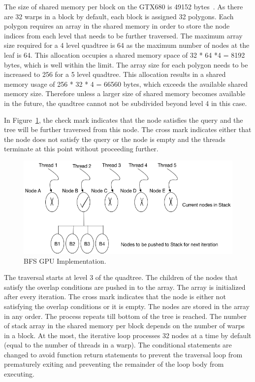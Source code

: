 The size of shared memory per block on the GTX680 is 49152 bytes~\cite{nvidia:12:gtx680tech}. As there are 32 warps in a block by default, each block is assigned  32 polygons. Each polygon requires an array in the shared memory in order to store the node indices from each level that needs to be further traversed. The maximum array size required for a 4 level quadtree is 64 as the maximum number of nodes at the leaf is 64. This allocation occupies a shared memory space of 32 * 64 *4 = 8192 bytes, which is well within the limit. The array size for each polygon needs to be increased to 256 for a 5 level quadtree. This allocation results in a shared memory usage of 256 * 32 * 4  = 66560 bytes, which exceeds the available shared memory size. Therefore unless a larger size of shared memory becomes available in the future, the quadtree cannot not be subdivided beyond level 4 in this case.

In Figure~\ref{fig:bfs_gpu}, the check mark indicates that the node  satisfies the query and the tree will be further traversed from this node. The cross mark indicates either that the node does not satisfy the query or the node is empty and the threads terminate at this point without proceeding further.

\begin{figure}[H]
\vspace{0.5in}
\includegraphics[scale=0.5]{Images/BFSgpu}
\vspace{0.5in}
\caption{BFS GPU Implementation.}
\label{fig:bfs_gpu}
\end{figure}

The traversal starts at level 3 of the quadtree. The children of the nodes that satisfy the overlap conditions are pushed in to the array. The array is initialized after every iteration. 
The cross mark indicates that the node is either not satisfying the overlap conditions or it is empty. The nodes are stored in the array in any order. The process repeats till bottom of the tree is reached. 
The number of stack array in the shared memory per block depends on the number of warps in a block. At the most, the iterative loop processes 32 nodes at a time by default (equal to the number of threads in a warp). The conditional statements are changed to avoid function return statements to prevent the traversal loop from prematurely exiting and preventing the remainder of the loop body from executing.

